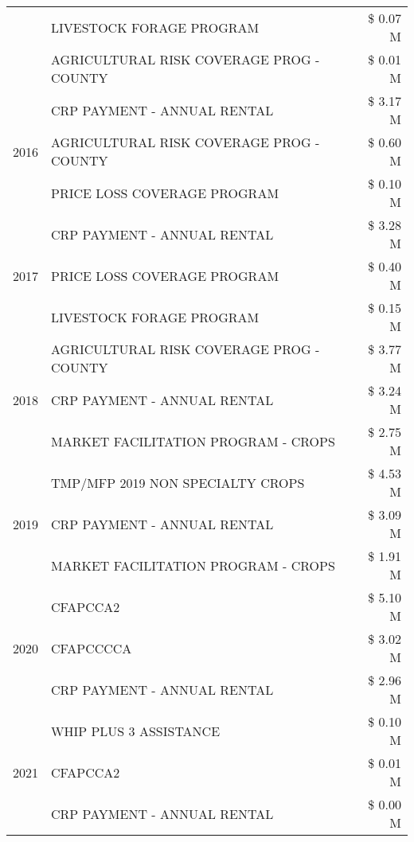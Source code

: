 \begin{tabular}{llr}
 & LIVESTOCK FORAGE PROGRAM & \$ 0.07 M \\
 & AGRICULTURAL RISK COVERAGE PROG - COUNTY & \$ 0.01 M \\
\cline{1-3}
\multirow[t]{3}{*}{2016} & CRP PAYMENT - ANNUAL RENTAL & \$ 3.17 M \\
 & AGRICULTURAL RISK COVERAGE PROG - COUNTY & \$ 0.60 M \\
 & PRICE LOSS COVERAGE PROGRAM & \$ 0.10 M \\
\cline{1-3}
\multirow[t]{3}{*}{2017} & CRP PAYMENT - ANNUAL RENTAL & \$ 3.28 M \\
 & PRICE LOSS COVERAGE PROGRAM & \$ 0.40 M \\
 & LIVESTOCK FORAGE PROGRAM & \$ 0.15 M \\
\cline{1-3}
\multirow[t]{3}{*}{2018} & AGRICULTURAL RISK COVERAGE PROG - COUNTY & \$ 3.77 M \\
 & CRP PAYMENT - ANNUAL RENTAL & \$ 3.24 M \\
 & MARKET FACILITATION PROGRAM - CROPS & \$ 2.75 M \\
\cline{1-3}
\multirow[t]{3}{*}{2019} & TMP/MFP 2019 NON SPECIALTY CROPS & \$ 4.53 M \\
 & CRP PAYMENT - ANNUAL RENTAL & \$ 3.09 M \\
 & MARKET FACILITATION PROGRAM - CROPS & \$ 1.91 M \\
\cline{1-3}
\multirow[t]{3}{*}{2020} & CFAPCCA2 & \$ 5.10 M \\
 & CFAPCCCCA & \$ 3.02 M \\
 & CRP PAYMENT - ANNUAL RENTAL & \$ 2.96 M \\
\cline{1-3}
\multirow[t]{3}{*}{2021} & WHIP PLUS 3 ASSISTANCE & \$ 0.10 M \\
 & CFAPCCA2 & \$ 0.01 M \\
 & CRP PAYMENT - ANNUAL RENTAL & \$ 0.00 M \\
\cline{1-3}
\bottomrule
\end{tabular}
